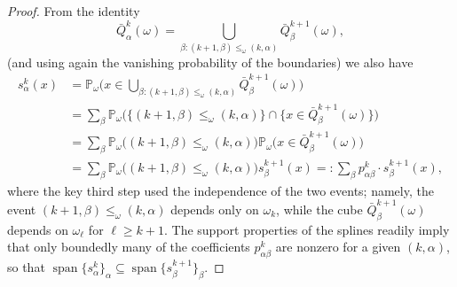 \documentclass{amsart}
\numberwithin{equation}{section}
\theoremstyle{plain}
\theoremstyle{definition}
\theoremstyle{remark}
\begin{document}
{{\begin{proof}
From the identity
\begin{equation*}
   \bar{Q}^k_{\alpha}(\omega)=\bigcup_{\beta:(k+1,\beta)\leq_{\omega}(k,\alpha)}\bar{Q}^{k+1}_{\beta}(\omega),
\end{equation*}
(and using again the vanishing probability of the boundaries) we also have
\begin{equation*}
\begin{split}
  s^k_{\alpha}(x) &={\mathbb{P}}_{\omega}\Big(x\in\bigcup_{\beta:(k+1,\beta)\leq_{\omega}(k,\alpha)}\bar{Q}^{k+1}_{\beta}(\omega)\Big) \\
   &=\sum_{\beta}{\mathbb{P}}_{\omega}\Big(\Big\{(k+1,\beta)\leq_{\omega}(k,\alpha)\Big\}\cap\Big\{x\in\bar{Q}^{k+1}_{\beta}(\omega)\Big\}\Big) \\
   &=\sum_{\beta}{\mathbb{P}}_{\omega}\Big((k+1,\beta)\leq_{\omega}(k,\alpha)\Big){\mathbb{P}}_{\omega}\Big(x\in\bar{Q}^{k+1}_{\beta}(\omega)\Big) \\
   &=\sum_{\beta}{\mathbb{P}}_{\omega}\Big((k+1,\beta)\leq_{\omega}(k,\alpha)\Big)s^{k+1}_{\beta}(x)=:\sum_{\beta}p^k_{\alpha\beta}\cdot s^{k+1}_{\beta}(x),
\end{split}
\end{equation*}
where the key third step used the independence of the two events; namely, the event $(k+1,\beta)\leq_{\omega}(k,\alpha)$ depends only on $\omega_k$, while the cube $\bar{Q}^{k+1}_{\beta}(\omega)$ depends on $\omega_{\ell}$ for $\ell\geq k+1$. The support properties of the splines readily imply that only boundedly many of the coefficients $p^k_{\alpha\beta}$ are nonzero for a given $(k,\alpha)$, so that ${\operatorname{span}}\{s^k_{\alpha}\}_{\alpha}\subseteq{\operatorname{span}}\{s^{k+1}_{\beta}\}_{\beta}$.


\end{proof}}}
\end{document}
